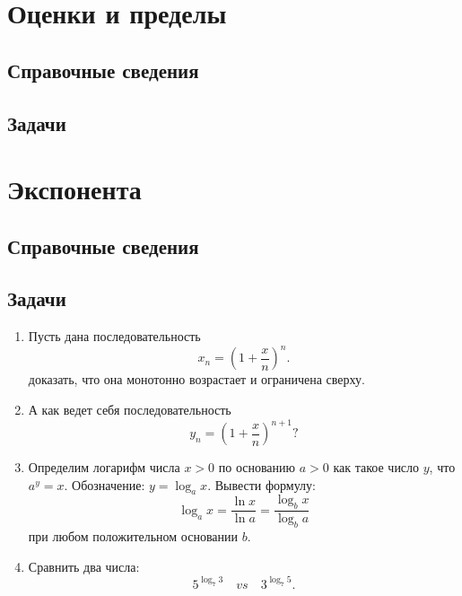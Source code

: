 \begin{comment}
\chapter{16. Элементы математического анализа}
\end{comment}

\section{Оценки и пределы}

\subsection*{Справочные сведения}

\subsection*{Задачи}


\section{Экспонента}

\subsection*{Справочные сведения}

\subsection*{Задачи}

\begin{enumerate}
\item Пусть дана последовательность
$$
x_n = \left(1+\frac xn\right)^n.
$$
доказать, что она монотонно возрастает и ограничена сверху.
\item А как ведет себя последовательность
$$
y_n = \left(1+\frac xn\right)^{n+1}?
$$
\item Определим логарифм числа $x>0$ по основанию $a>0$ как такое число $y$, что $a^y=x$. Обозначение: $y=\log_a x$. Вывести формулу:
$$
\log_a x = \frac{\ln x}{\ln a} = \frac{\log_b x}{\log_b a}
$$
при любом положительном основании $b$.
\item Сравнить два числа:
$$
5^{\log_7 3}\quad vs\quad   3^{\log_7 5}.
$$

\end{enumerate}



